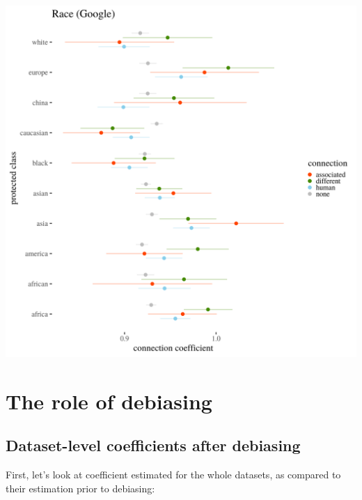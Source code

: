 \documentclass[12pt,]{book}
\begin{document}
\includegraphics[width=14cm]{../images/visRaceGoogle.png}

\chapter{The role of debiasing}\label{the-role-of-debiasing}


\section{Dataset-level coefficients after
debiasing}\label{dataset-level-coefficients-after-debiasing}

First, let's look at coefficient estimated for the whole datasets, as
compared to their estimation prior to debiasing:
\end{document}
